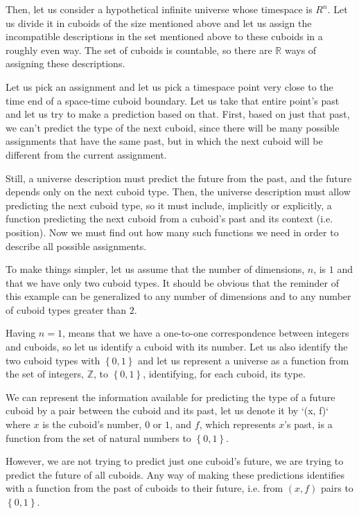 \documentclass[a4paper
,draft
]{article}
\def\reale{\mathbb{R}}
\def\intregi{\mathbb{Z}}
\newcommand{\multime}[1]{\left\{ #1 \right\}}
\begin{document}
Then, let us consider a hypothetical infinite universe whose timespace is $R^n$.
Let us divide it in cuboids of the size mentioned above
and let us assign the incompatible
descriptions in the set mentioned above to these cuboids in a roughly even
way.
The set of cuboids is countable, so there are $\reale$ ways of
assigning these descriptions.

Let us pick an assignment and let us pick a timespace point very close to the
time end of a space-time cuboid boundary.
Let us take that entire point's past and let us try to make a prediction based
on that.
First, based on just that past, we can't predict the type of the next cuboid,
since there will be many possible assignments that have the same past, but in
which the next cuboid will be different from the current assignment.

Still, a universe description must predict the future from the past, and
the future depends only on the next cuboid type. Then, the universe
description must allow predicting the next cuboid type, so it must include,
implicitly or explicitly,
a function predicting the next cuboid from a cuboid's past
and its context (i.e. position). Now we must find out how many such functions
we need in order to describe all possible assignments.

To make things simpler, let us assume that the number of dimensions, $n$,
is $1$ and that we have only two cuboid types.
It should be obvious that
the reminder of this example can be generalized to any number of dimensions
and to any number of cuboid types greater than $2$.

Having $n=1$, means that we have a one-to-one correspondence between
integers and cuboids, so let us identify a cuboid with its number.
Let us also identify the two cuboid types with $\multime{0, 1}$ and
let us represent a universe as a function from the set of integers, $\intregi$,
to $\multime{0, 1}$, identifying, for each cuboid, its type.

We can represent the information available for predicting the type of a future
cuboid by a pair between the cuboid and its past, let us denote it
by `(x, f)` where $x$ is the cuboid's number, $0$ or $1$,
and $f$, which represents $x$'s past, is a function from the set of natural
numbers to $\multime{0,1}$.

However, we are not trying to predict just one cuboid's future,
we are trying to predict the future of all cuboids.
Any way of making these predictions identifies with a function from the past
of cuboids to their future, i.e. from $(x, f)$ pairs to $\multime{0, 1}$.
\end{document}

